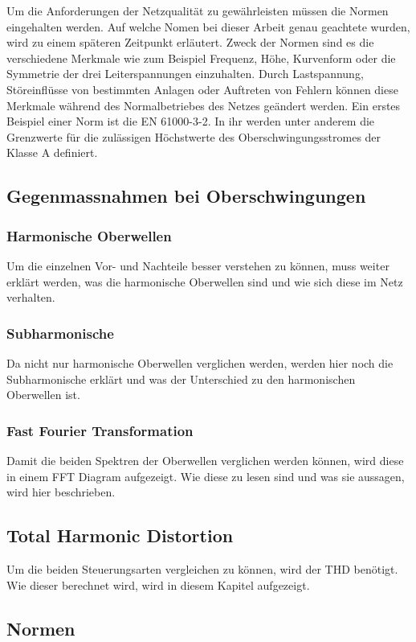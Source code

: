 Um die Anforderungen der Netzqualität zu gewährleisten müssen die Normen eingehalten werden. Auf welche Nomen bei dieser Arbeit genau geachtete wurden, wird zu einem späteren Zeitpunkt erläutert. Zweck der Normen sind es  die verschiedene Merkmale wie zum Beispiel Frequenz, Höhe, Kurvenform oder die Symmetrie der drei Leiterspannungen einzuhalten. Durch Lastspannung, Störeinflüsse von bestimmten Anlagen oder Auftreten von Fehlern können diese Merkmale während des Normalbetriebes des Netzes geändert werden. Ein erstes Beispiel einer Norm ist die EN 61000-3-2. In ihr werden unter anderem die Grenzwerte für die zulässigen Höchstwerte des Oberschwingungsstromes der Klasse A definiert. 


\subsection{Gegenmassnahmen bei Oberschwingungen}

\subsubsection{Harmonische Oberwellen}
Um die einzelnen Vor- und Nachteile besser verstehen zu können, muss weiter erklärt werden, was die harmonische Oberwellen sind und wie sich diese im Netz verhalten.
\subsubsection{Subharmonische}
Da nicht nur harmonische Oberwellen verglichen werden, werden hier noch die Subharmonische erklärt und was der Unterschied zu den harmonischen Oberwellen ist. 
\subsubsection{Fast Fourier Transformation}
Damit die beiden Spektren der Oberwellen verglichen werden können, wird diese in einem FFT Diagram aufgezeigt. Wie diese zu lesen sind und was sie aussagen, wird hier beschrieben. 

\subsection{Total Harmonic Distortion}
Um die beiden Steuerungsarten vergleichen zu können, wird der THD benötigt. Wie dieser berechnet wird, wird in diesem Kapitel aufgezeigt. 


\subsection{Normen}


